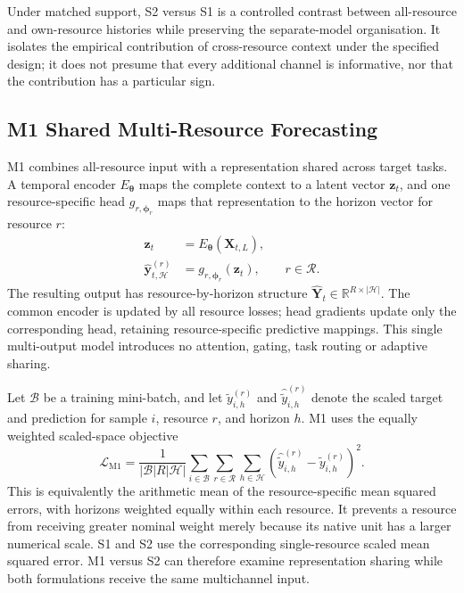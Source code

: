 \documentclass[a4paper,fleqn]{cas-dc}
\begin{document}
Under matched support, S2 versus S1 is a controlled contrast between
all-resource and own-resource histories while preserving the separate-model
organisation. It isolates the empirical contribution of cross-resource
context under the specified design; it does not presume that every additional
channel is informative, nor that the contribution has a particular sign.

\subsection{M1 Shared Multi-Resource Forecasting}
\label{sec:m1}

M1 combines all-resource input with a representation shared across target
tasks. A temporal encoder $E_{\boldsymbol{\theta}}$ maps the complete context
to a latent vector $\mathbf{z}_t$, and one resource-specific head
$g_{r,\boldsymbol{\phi}_r}$ maps that representation to the horizon vector for
resource $r$:
\begin{equation}
  \begin{aligned}
    \mathbf{z}_t
      &= E_{\boldsymbol{\theta}}(\mathbf{X}_{t,L}), \\
    \widehat{\mathbf{y}}_{t,\mathcal{H}}^{(r)}
      &= g_{r,\boldsymbol{\phi}_r}(\mathbf{z}_t),
      && r\in\mathcal{R}.
  \end{aligned}
  \label{eq:m1-forecast}
\end{equation}
The resulting output has resource-by-horizon structure
$\widehat{\mathbf{Y}}_{t}\in\mathbb{R}^{R\times|\mathcal{H}|}$.
The common encoder is updated by all resource losses; head gradients update
only the corresponding head, retaining resource-specific predictive mappings.
This single multi-output model introduces no attention, gating, task routing
or adaptive sharing.

Let $\mathcal{B}$ be a training mini-batch, and let
$\widetilde{y}_{i,h}^{(r)}$ and
$\widehat{\widetilde{y}}_{i,h}^{(r)}$ denote the scaled target and prediction
for sample $i$, resource $r$, and horizon $h$. M1 uses the equally weighted
scaled-space objective
\begin{equation}
  \mathcal{L}_{\mathrm{M1}}
  = \frac{1}{|\mathcal{B}|R|\mathcal{H}|}
    \sum_{i\in\mathcal{B}}
    \sum_{r\in\mathcal{R}}
    \sum_{h\in\mathcal{H}}
    \left(
      \widehat{\widetilde{y}}_{i,h}^{(r)}
      - \widetilde{y}_{i,h}^{(r)}
    \right)^2.
  \label{eq:m1-loss}
\end{equation}
This is equivalently the arithmetic mean of the resource-specific mean squared
errors, with horizons weighted equally within each resource. It prevents a
resource from receiving greater nominal weight merely because its native unit
has a larger numerical scale. S1 and S2 use the corresponding single-resource
scaled mean squared error. M1 versus S2 can therefore examine representation
sharing while both formulations receive the same multichannel input.
\end{document}
